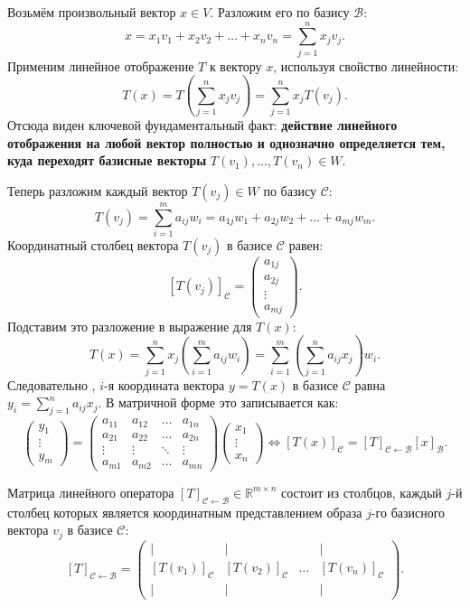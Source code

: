 Возьмём произвольный вектор $x \in V$.
Разложим его по базису $\mathcal{B}$:
\[ x = x_1 v_1 + x_2 v_2 + \dots + x_n v_n = \sum_{j=1}^n x_j v_j. \]
Применим линейное отображение $T$ к вектору $x$, используя свойство линейности:
\[ T(x) = T\left(\sum_{j=1}^n x_j v_j\right) = \sum_{j=1}^n x_j T(v_j). \]
Отсюда виден ключевой фундаментальный факт: \textbf{действие линейного отображения на любой вектор полностью и
однозначно определяется тем, куда переходят базисные векторы} $T(v_1), \dots, T(v_n) \in W$.

Теперь разложим каждый вектор $T(v_j) \in W$ по базису $\mathcal{C}$:
\[ T(v_j) = \sum_{i=1}^m a_{ij} w_i = a_{1j} w_1 + a_{2j} w_2 + \dots + a_{mj} w_m. \]
Координатный столбец вектора $T(v_j)$ в базисе $\mathcal{C}$ равен:
\[ [T(v_j)]_\mathcal{C} = \begin{pmatrix}
                              a_{1j} \\ a_{2j} \\ \vdots \\ a_{mj}
\end{pmatrix}. \]
Подставим это разложение в выражение для $T(x)$:
\[ T(x)=\sum_{j=1}^n x_j\left(\sum_{i=1}^m a_{ij} w_i\right)=\sum_{i=1}^m \left( \sum_{j=1}^n a_{ij} x_j\right) w_i.
\]
Следовательно , $i$-я координата вектора $y = T(x)$ в базисе $\mathcal{C}$ равна $y_i = \sum_{j=1}^n a_{ij} x_j$.
В матричной форме это записывается как:
\[ \begin{pmatrix}
       y_1 \\ \vdots \\ y_m
\end{pmatrix} = \begin{pmatrix}
                    a_{11} & a_{12} & \dots & a_{1n} \\ a_{21} & a_{22} & \dots & a_{2n} \\ \vdots
                    & \vdots & \ddots & \vdots \\ a_{m1} & a_{m2} & \dots & a_{mn}
\end{pmatrix} \begin{pmatrix}
                  x_1 \\ \vdots \\ x_n
\end{pmatrix} \iff [T(x)]_\mathcal{C} = [T]_{\mathcal{C} \leftarrow
\mathcal{B}} [x]_\mathcal{B}. \]

\begin{theorem}
Матрица линейного оператора $[T]_{\mathcal{C} \leftarrow \mathcal{B}} \in \mathbb{R}^{m \times n}$ состоит из столбцов,
каждый $j$-й столбец которых является координатным представлением образа $j$-го базисного вектора $v_j$ в базисе
$\mathcal{C}$:
\[ [T]_{\mathcal{C} \leftarrow \mathcal{B}} = \begin{pmatrix}
                                                  | & | & & | \\ [T(v_1)]_\mathcal{C} & [T(v_2)]_\mathcal{C}
                                                  & \dots & [T(v_n)]_\mathcal{C} \\
                                                  | & | & & |
\end{pmatrix}. \]
\end{theorem}


